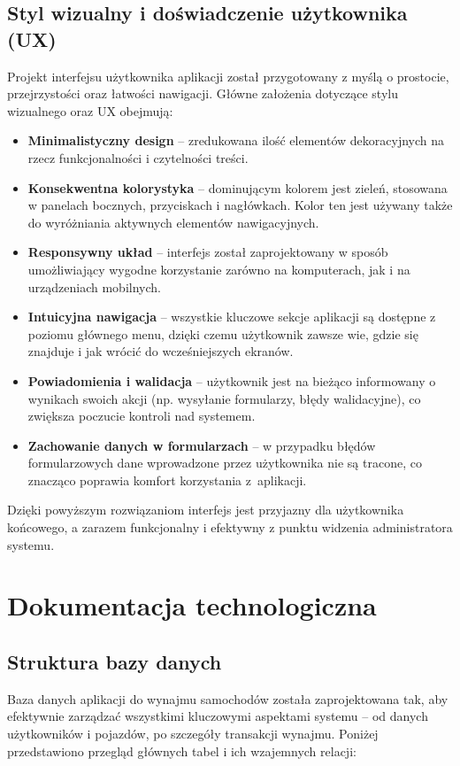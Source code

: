 \documentclass[12pt]{article}
\begin{document}
	\subsection{Styl wizualny i doświadczenie użytkownika (UX)}
	Projekt interfejsu użytkownika aplikacji został przygotowany z myślą o prostocie, przejrzystości oraz łatwości nawigacji. Główne założenia dotyczące stylu wizualnego oraz UX obejmują:
	\begin{itemize}
		\item \textbf{Minimalistyczny design} – zredukowana ilość elementów dekoracyjnych na rzecz funkcjonalności i czytelności treści.
		\item \textbf{Konsekwentna kolorystyka} – dominującym kolorem jest zieleń, stosowana w panelach bocznych, przyciskach i nagłówkach. Kolor ten jest używany także do wyróżniania aktywnych elementów nawigacyjnych.
		\item \textbf{Responsywny układ} – interfejs został zaprojektowany w sposób umożliwiający wygodne korzystanie zarówno na komputerach, jak i na urządzeniach mobilnych.
		\item \textbf{Intuicyjna nawigacja} – wszystkie kluczowe sekcje aplikacji są dostępne z poziomu głównego menu, dzięki czemu użytkownik zawsze wie, gdzie się znajduje i jak wrócić do wcześniejszych ekranów.
		\item \textbf{Powiadomienia i walidacja} – użytkownik jest na bieżąco informowany o wynikach swoich akcji (np. wysyłanie formularzy, błędy walidacyjne), co zwiększa poczucie kontroli nad systemem.
		\item \textbf{Zachowanie danych w formularzach} – w przypadku błędów formularzowych dane wprowadzone przez użytkownika nie są tracone, co znacząco poprawia komfort korzystania z~aplikacji.
	\end{itemize}
	Dzięki powyższym rozwiązaniom interfejs jest przyjazny dla użytkownika końcowego, a zarazem funkcjonalny i efektywny z punktu widzenia administratora systemu.
	
	\section{Dokumentacja technologiczna}
	\label{sec:dokumentacja_technologiczna}
	\subsection{Struktura bazy danych}
	Baza danych aplikacji do wynajmu samochodów została zaprojektowana tak, aby efektywnie zarządzać wszystkimi kluczowymi aspektami systemu -- od danych użytkowników i pojazdów, po szczegóły transakcji wynajmu. Poniżej przedstawiono przegląd głównych tabel i ich wzajemnych relacji:
	
\end{document}
